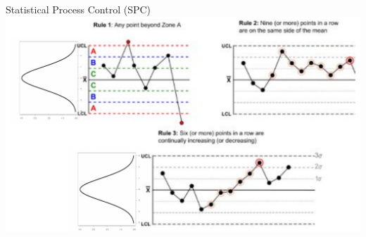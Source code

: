 \documentclass[ xcolor = pdftex, dvipsnames, table ]{beamer}
\begin{document}
\subsection{}
\begin{frame}{Statistical Process Control (SPC)}
%
\hspace{-0.7cm}
\includegraphics[width=\textwidth]{spcComp.pdf}
%
\end{frame}

%
%
\end{document}
